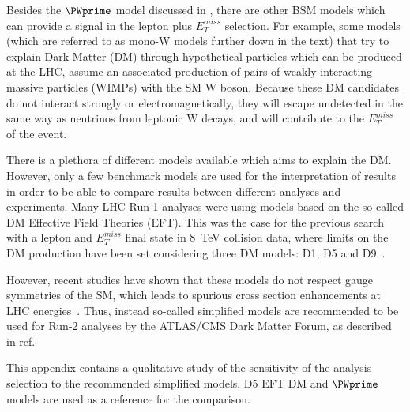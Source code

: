 Besides the $\PWprime$ model discussed in , there are other BSM models 
which can provide a signal in the lepton plus $E_{T}^{miss}$ selection.
For example, some models (which are referred to as mono-W models further down in the text) that try to explain Dark Matter (DM) through hypothetical particles which can be produced at the LHC, assume an associated production of pairs of weakly interacting massive particles (WIMPs) with the SM W boson.
Because these DM candidates do not interact strongly or electromagnetically, they will escape undetected in the same way as neutrinos from leptonic W decays, and will contribute to the $E_{T}^{miss}$ of the event.

There is a plethora of different models available which aims to explain the DM.
However, only a few benchmark models are used for the interpretation of results in order to be able to compare results between different analyses and experiments.
Many LHC Run-1 analyses were using models based on the so-called DM Effective Field Theories (EFT). 
This was the case for the previous search with a lepton and $E_T^{miss}$ final state in 8~TeV collision data, where limits on the DM production have been set considering three DM models: D1, D5 and D9~\cite{wprime_8TeV}. 

However, recent studies have shown that these models do not respect gauge symmetries of the SM, which leads to spurious cross section enhancements at LHC energies~\cite{arXiv:1503.07874}.
Thus, instead so-called simplified models are recommended to be used for Run-2 analyses
by the ATLAS/CMS Dark Matter Forum, as described in ref.~\cite{DM_forum_2015}

This appendix contains a qualitative study of the sensitivity of the analysis selection
to the recommended simplified models. D5 EFT DM and $\PWprime$ models are used as a reference for the comparison.



